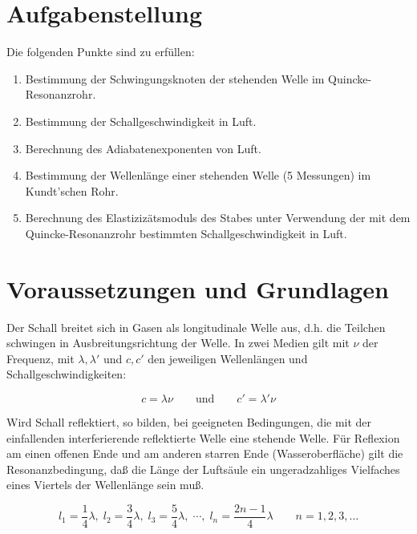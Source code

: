 \documentclass[11pt]{scrartcl}
\begin{document}

\tableofcontents
\newpage
\section{Aufgabenstellung}
\label{sec:aufgabenstellung}

Die folgenden Punkte sind zu erfüllen:
\begin{enumerate}
    \item Bestimmung der Schwingungsknoten der stehenden Welle im Quincke-Resonanzrohr.
    \item Bestimmung der Schallgeschwindigkeit in Luft.
    \item Berechnung des Adiabatenexponenten von Luft.
    \item Bestimmung der Wellenlänge einer stehenden Welle (5 Messungen) im Kundt’schen Rohr.
    \item Berechnung des Elastizizätsmoduls des Stabes unter Verwendung der mit dem Quincke-Resonanzrohr bestimmten Schallgeschwindigkeit in Luft.
\end{enumerate}

\section{Voraussetzungen und Grundlagen}
\label{sec:voraussetzungen_grundlagen}

Der Schall breitet sich in Gasen als longitudinale Welle aus, d.h. 
die Teilchen schwingen in
Ausbreitungsrichtung der Welle. In zwei Medien gilt mit $\nu$
der Frequenz, mit $\lambda, \lambda'$ und $c, c'$ den
jeweiligen Wellenlängen und Schallgeschwindigkeiten:

\begin{equation}
    \label{eq:cist}
    c = \lambda \nu \qquad \text{und} \qquad c' = \lambda' \nu
\end{equation}

Wird Schall reflektiert, so bilden, bei geeigneten Bedingungen, 
die mit der einfallenden interferierende
reflektierte Welle eine stehende Welle. Für Reflexion am einen offenen 
Ende und
am anderen starren Ende (Wasseroberfläche) gilt die Resonanzbedingung, 
daß die Länge der
Luftsäule ein ungeradzahliges Vielfaches eines Viertels der Wellenlänge
sein muß.

\begin{equation}
    l_{1} = \frac{1}{4} \lambda,\; l_{2} = \frac{3}{4} \lambda,\;  l_{3} = \frac{5}{4} \lambda,\;  \cdots,\;  l_{n} = \frac{2n-1}{4} \lambda \qquad n = 1,2,3, \dots  \label{eq:lambda_avg}
\end{equation}
\end{document}
